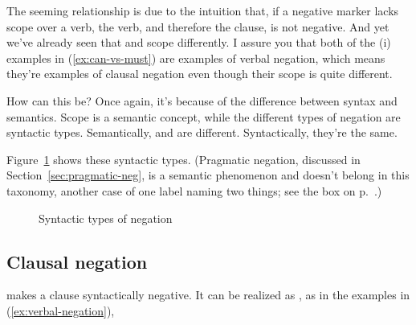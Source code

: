 The seeming relationship is due to the intuition that, if a negative marker lacks scope over a verb, the verb, and therefore the clause, is not negative. And yet we've already seen that  and  scope differently. I assure you that both of the (i) examples in (\ref{ex:can-vs-must}) are examples of verbal negation, which means they're examples of clausal negation even though their scope is quite different.

How can this be? Once again, it's because of the difference between syntax and semantics. Scope is a semantic concept, while the different types of negation are syntactic types. Semantically,  and  are different. Syntactically, they're the same.

Figure~\ref{fig:neg-types} shows these syntactic types. (Pragmatic negation, discussed in Section~\ref{sec:pragmatic-neg}, is a semantic phenomenon and doesn't belong in this taxonomy, another case of one label naming two things; see the box on p.~\pageref{box:one-label-two-things}.)

\begin{figure}
    \caption{Syntactic types of negation}
    \label{fig:neg-types}
\end{figure}




\subsection{Clausal negation} \label{sec:clausal-negation}
\nopagebreak[4]
 makes a clause syntactically negative. It can be realized as , as in the examples in (\ref{ex:verbal-negation}),

